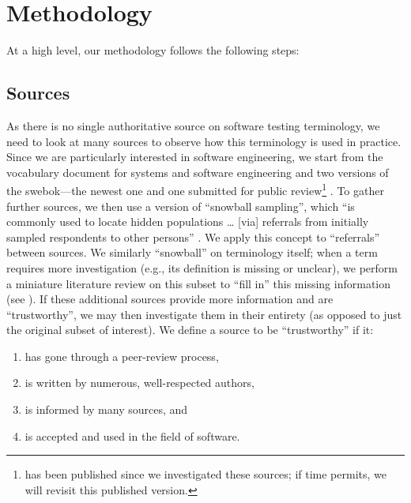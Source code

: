 \section{Methodology}
\label{methodology}

At a high level, our
methodology follows the following steps:



\subsection{Sources}
\label{sources}
As there is no single authoritative source on software testing terminology,
we need to look at many sources to observe how this terminology is used in
practice. Since we are particularly interested in software engineering, we
start from the vocabulary document for systems and software engineering%
\citep{IEEE2017} and two versions of the \acf{swebok}---the newest
one \citep{SWEBOK2014} and one submitted for public review\footnote{
     \citep{SWEBOK2024} has been published since we investigated
    these sources; if time permits, we will revisit this published version.
} \citep{SWEBOK2024}. To gather further sources, we then use a version of ``snowball sampling'',
which ``is commonly used to locate hidden populations \dots{} [via] referrals
from initially sampled respondents to other persons'' \citep{Johnson2014}. We
apply this concept to ``referrals'' between sources. \addTextEx{} We similarly
``snowball'' on terminology itself; when a term requires more investigation
(e.g., its definition is missing or unclear), we perform a
miniature literature review on this subset to ``fill in'' this missing
information (see ). If these additional sources provide more
information and are ``trustworthy'', we may then investigate them in their
entirety (as opposed to just the original subset of interest). We define a
source to be ``trustworthy'' if it:
\begin{enumerate}
    \item has gone through a peer-review process,
    \item is written by numerous, well-respected authors,
    \item is informed by many sources, and
    \item is accepted and used in the field of software.
\end{enumerate}

